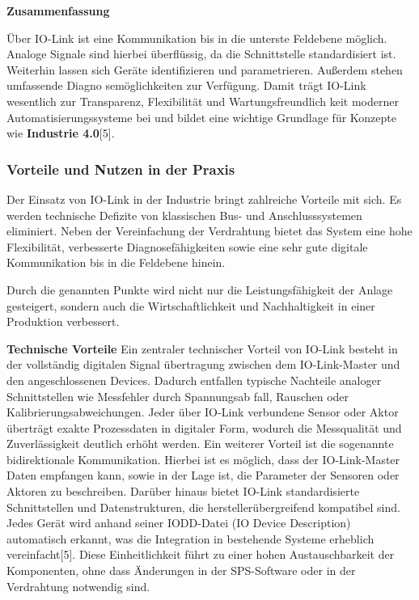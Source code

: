 \textbf{Zusammenfassung}

Über IO-Link ist eine Kommunikation bis in die unterste Feldebene möglich. Analoge
Signale sind hierbei überflüssig, da die Schnittstelle standardisiert ist. Weiterhin lassen
sich Geräte identifizieren und parametrieren. Außerdem stehen umfassende Diagno
semöglichkeiten zur Verfügung.
Damit trägt IO-Link wesentlich zur Transparenz, Flexibilität und Wartungsfreundlich
keit moderner Automatisierungssysteme bei und bildet eine wichtige Grundlage für
Konzepte wie \textbf{Industrie 4.0}[5].


\subsubsection{Vorteile und Nutzen in der Praxis}
Der Einsatz von IO-Link in der Industrie bringt zahlreiche Vorteile mit sich. Es werden
technische Defizite von klassischen Bus- und Anschlusssystemen eliminiert. Neben der
Vereinfachung der Verdrahtung bietet das System eine hohe Flexibilität, verbesserte
Diagnosefähigkeiten sowie eine sehr gute digitale Kommunikation bis in die Feldebene
hinein.

Durch die genannten Punkte wird nicht nur die Leistungsfähigkeit der Anlage gesteigert,
sondern auch die Wirtschaftlichkeit und Nachhaltigkeit in einer Produktion verbessert.


\textbf{Technische Vorteile}
Ein zentraler technischer Vorteil von IO-Link besteht in der vollständig digitalen Signal
übertragung zwischen dem IO-Link-Master und den angeschlossenen Devices. Dadurch
entfallen typische Nachteile analoger Schnittstellen wie Messfehler durch Spannungsab
fall, Rauschen oder Kalibrierungsabweichungen. Jeder über IO-Link verbundene Sensor
oder Aktor überträgt exakte Prozessdaten in digitaler Form, wodurch die Messqualität
und Zuverlässigkeit deutlich erhöht werden.
Ein weiterer Vorteil ist die sogenannte bidirektionale Kommunikation. Hierbei ist es
möglich, dass der IO-Link-Master Daten empfangen kann, sowie in der Lage ist, die
Parameter der Sensoren oder Aktoren zu beschreiben.
Darüber hinaus bietet IO-Link standardisierte Schnittstellen und Datenstrukturen, die
herstellerübergreifend kompatibel sind. Jedes Gerät wird anhand seiner IODD-Datei (IO
Device Description) automatisch erkannt, was die Integration in bestehende Systeme
erheblich vereinfacht[5]. Diese Einheitlichkeit führt zu einer hohen Austauschbarkeit der
Komponenten, ohne dass Änderungen in der SPS-Software oder in der Verdrahtung
notwendig sind.


